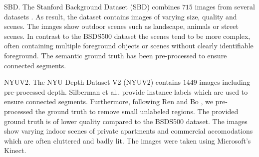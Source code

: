 \documentclass[5p]{elsarticle}
\makeatletter
\DeclareRobustCommand\onedot{\futurelet\@let@token\@onedot}
\def\@onedot{\ifx\@let@token.\else.\null\fi\xspace}
\def\etal{{et al}\onedot}
\def\BSDS{BSDS500\xspace}
\def\NYU{NYUV2\xspace}
\def\SBD{SBD\xspace}
\makeatother
\begin{document}
{\SBD \cite{GouldFultonKoller:2009}.} The Stanford Background Dataset (\SBD)
combines $715$ images from several datasets \cite{RussellTorralbaMurphyFreeman:2008, Criminisi:2004, EveringhamVanGoolWilliamsWinnZisserman:2007, HoiemEfrosHebert:2007}.
As result, the dataset contains images of varying size, quality and scenes.
The images show outdoor scenes such as landscape, animals or street scenes.
In contrast to the \BSDS dataset the scenes tend to be more complex, often containing
multiple foreground objects or scenes without clearly identifiable foreground.
The semantic ground truth has been pre-processed to ensure connected segments.

{\NYU \cite{SilbermanHoiemKohliFergus:2012}.} The NYU Depth Dataset V2 (\NYU)
contains $1449$ images including pre-processed depth. Silberman \etal provide instance
labels which are used to ensure connected segments. Furthermore, following
Ren and Bo \cite{RenBo:2012}, we pre-processed the ground truth to remove small
unlabeled regions. The provided ground truth is of lower quality compared to
the \BSDS dataset. The images show varying indoor scenes of private apartments and
commercial accomodations which are often cluttered and badly lit.
The images were taken using Microsoft's Kinect.
\end{document}
